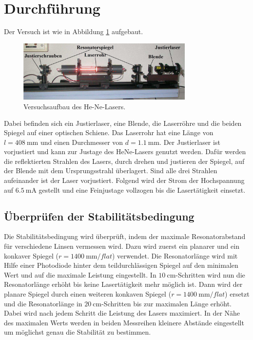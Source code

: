 \section{Durchführung}
\label{sec:Durchführung}
Der Versuch ist wie in Abbildung \ref{pic:aufbau} aufgebaut.
\begin{figure}
    \centering
    \includegraphics[width = 0.78\textwidth]{pics/Laseraufbau.png}
    \caption{Versuchsaufbau des He-Ne-Lasers.\cite{V61}}
    \label{pic:aufbau}
\end{figure}
Dabei befinden sich ein Justierlaser, eine Blende, die Laserröhre und die beiden Spiegel auf einer
optischen Schiene. Das Laserrohr hat eine Länge von $l = \SI{408}{\milli\meter}$ und einen Durchmesser von $d = \SI{1.1}{\milli\meter}$.
Der Justierlaser ist vorjustiert und kann zur Justage
des HeNe-Lasers genutzt werden. Dafür werden die reflektierten Strahlen des Lasers, durch drehen und justieren der Spiegel,
auf der Blende mit dem Ursprungsstrahl überlagert. Sind alle drei Strahlen aufeinander ist der Laser vorjustiert.
Folgend wird der Strom der Hochspannung auf $\SI{6.5}{\milli\ampere}$ gestellt und eine
Feinjustage vollzogen bis die Lasertätigkeit einsetzt.

\subsection{Überprüfen der Stabilitätsbedingung}
Die Stabilitätsbedingung wird überprüft, indem der maximale Resonatorabstand
für verschiedene Linsen vermessen wird.
Dazu wird zuerst ein planarer und ein konkaver Spiegel ($r = \SI{1400}{\milli\meter\per flat}$) verwendet.
Die Resonatorlänge wird mit Hilfe einer Photodiode hinter dem teildurchlässigen Spiegel auf den minimalen Wert und auf die maximale Leistung eingestellt.
In $\SI{10}{\centi\meter}$-Schritten wird nun die Resonatorlänge erhöht bis keine Lasertätigkeit mehr möglich ist.
Dann wird der planare Spiegel durch einen weiteren konkaven Spiegel ($r = \SI{1400}{\milli\meter\per flat}$)
ersetzt und die Resonatorlänge in $\SI{20}{\centi\meter}$-Schritten bis zur maximalen Länge erhöht.
Dabei wird nach jedem Schritt die Leistung des Lasers maximiert.
In der Nähe des maximalen Werts werden in beiden Messreihen kleinere Abstände eingestellt um möglichst genau die 
Stabilität zu bestimmen.

